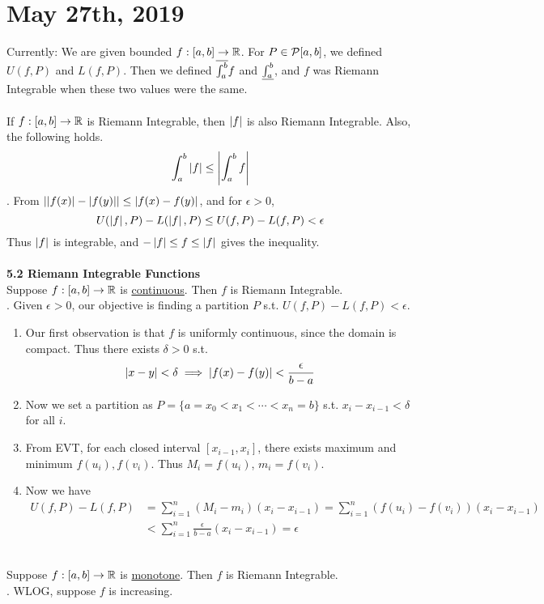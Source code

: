 \section*{May 27th, 2019}
Currently: We are given bounded $f: [a, b]\rightarrow\mathbb{R}$. For $P\in \mathcal{P}[a, b]$, we defined $U(f, P)$ and $L(f, P)$. Then we defined $\overline{\int_a^b} f$ and $\underline{\int_a^b}$, and $f$ was Riemann Integrable when these two values were the same.\\
\\
 If $f:[a, b]\rightarrow\mathbb{R}$ is Riemann Integrable, then $\left|f\right|$ is also Riemann Integrable. Also, the following holds.$$ \int_a^b \left|f\right| \leq\left|\int_a^b f\right| $$
\pf. From $\left|\left|f(x)\right| - \left|f(y)\right|\right| \leq \left|f(x)-f(y)\right|$, and for $\epsilon > 0$, $$U(\left|f\right|, P) - L(\left|f\right|, P) \leq U(f, P) - L(f, P) < \epsilon$$
Thus $\left|f\right|$ is integrable, and $-\left|f\right|\leq f \leq \left|f\right|$ gives the inequality.\\
\\
\textbf{5.2 Riemann Integrable Functions}\\
 Suppose $f:[a, b]\rightarrow\mathbb{R}$ is \underline{continuous}. Then $f$ is Riemann Integrable.\\
\pf. Given $\epsilon > 0$, our objective is finding a  partition $P$ s.t. $U(f, P) - L(f, P) < \epsilon$.
\begin{enumerate}
	\item Our first observation is that $f$ is uniformly continuous, since the domain is compact.
	Thus there exists $\delta >0$ s.t. $$\left|x-y\right| < \delta \implies \left|f(x) - f(y)\right| < \frac{\epsilon}{b-a}$$
	\item Now we set a partition as $P = \{a=x_0 < x_1  < \cdots < x_n =b\}$ s.t. $x_i-x_{i-1} < \delta$ for all $i$.
	\item From EVT, for each closed interval $[x_{i-1}, x_i]$, there exists maximum and minimum $f(u_i), f(v_i)$. Thus $M_i = f(u_i)$, $m_i = f(v_i)$.
	\item Now we have 
	$$\begin{aligned}
		U(f, P) - L(f, P) &= \sum_{i=1}^n (M_i-m_i)(x_i - x_{i-1}) = \sum_{i=1}^n (f(u_i) - f(v_i)) (x_i -x_{i-1}) \\&< \sum_{i=1}^n \frac{\epsilon}{b-a} (x_i - x_{i-1}) = \epsilon	
	\end{aligned}$$
\end{enumerate}
~\\
 Suppose $f:[a, b]\rightarrow\mathbb{R}$ is \underline{monotone}. Then $f$ is Riemann Integrable.\\
\pf. WLOG, suppose $f$ is increasing.\\
